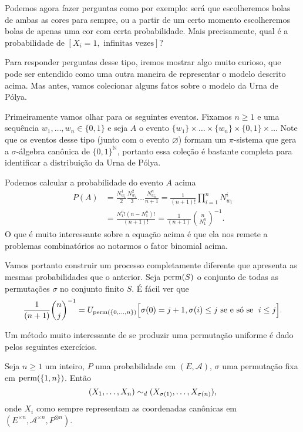 \begin{topics}
Podemos agora fazer perguntas como por exemplo: será que escolheremos bolas de ambas as cores para sempre, ou a partir de um certo momento escolheremos bolas de apenas uma cor com certa probabilidade.
Mais precisamente, qual é a probabilidade de $[X_i = 1, \text{ infinitas vezes}]$?


Para responder perguntas desse tipo, iremos mostrar algo muito curioso, que pode ser entendido como uma outra maneira de representar o modelo descrito acima.
Mas antes, vamos colecionar alguns fatos sobre o modelo da Urna de Pólya.

Primeiramente vamos olhar para os seguintes eventos.
Fixamos $n \geq 1$ e uma sequência $w_1, \dots, w_n \in \{0,1\}$ e seja $A$ o evento $\{w_1\} \times \dots \times \{w_n\} \times \{0,1\} \times \dots$
Note que os eventos desse tipo (junto com o evento $\varnothing$) formam um $\pi$-sistema que gera a $\sigma$-álgebra canônica de $\{0,1\}^\mathbb{N}$, portanto essa coleção é bastante completa para identificar a distribuição da Urna de Pólya.

Podemos calcular a probabilidade do evento $A$ acima
\begin{equation}
  \begin{split}
    P(A) & = \frac{N^1_{w_1}}2 \frac{N^2_{w_1}}3 \dots \frac{N^n_{w_n}}{n+1} = \frac{1}{(n+1)!} \prod_{i=1}^n N^i_{w_i}\\
    & = \frac{N^n_1! (n - N^n_1)!}{(n+1)!} = \frac{1}{(n+1)} \binom{n}{N^n_1}^{-1}.
  \end{split}
\end{equation}
O que é muito interessante sobre a equação acima é que ela nos remete a problemas combinatórios ao notarmos o fator binomial acima.

Vamos portanto construir um processo completamente diferente que apresenta as mesmas probabilidades que o anterior.
Seja $\operatorname{perm}(S)$ o conjunto de todas as permutações $\sigma$ no conjunto finito $S$.
É fácil ver que
\begin{equation*}
  \frac{1}{(n+1)} \binom{n}{j}^{-1} = U_{\operatorname{perm}(\{0, \dots, n\})} \Big[ \sigma(0) = j + 1, \sigma(i) \leq j \text{ se e só se } \; i \leq j \Big].
\end{equation*}

Um método muito interessante de se produzir uma permutação uniforme é dado pelos seguintes exercícios.

\begin{exercise}
  Seja $n \geq 1$ um inteiro, $P$ uma probabilidade em $(E, \mathcal{A})$, $\sigma$ uma permutação fixa em $\operatorname{perm}(\{1, n\})$.
  Então
  \begin{equation}
    \label{e:intercambiavel}
    (X_1, \dots, X_n) \sim_d (X_{\sigma(1)}, \dots, X_{\sigma(n)}),
  \end{equation}
  onde $X_i$ como sempre representam as coordenadas canônicas em $(E^{\times n}, \mathcal{A}^{\times n}, P^{\otimes n})$.
\end{exercise}


\end{topics}
